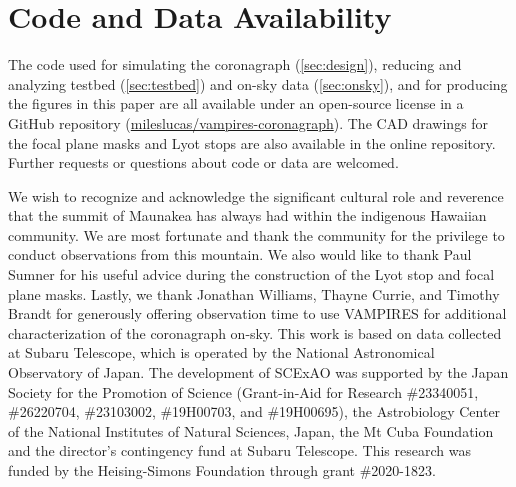 \documentclass[]{spie}  %
\begin{document}

\appendix    %


\section{Code and Data Availability}\label{sec:code}

The code used for simulating the coronagraph (\autoref{sec:design}), reducing and analyzing testbed (\autoref{sec:testbed}) and on-sky data (\autoref{sec:onsky}), and for producing the figures in this paper are all available under an open-source license in a GitHub repository (\href{https://github.com/mileslucas/vampires-coronagraph}{mileslucas/vampires-coronagraph}). The CAD drawings for the focal plane masks and Lyot stops are also available in the online repository. Further requests or questions about code or data are welcomed.

\acknowledgments

We wish to recognize and acknowledge the significant cultural role and reverence that the summit of Maunakea has always had within the indigenous Hawaiian community. We are most fortunate and thank the community for the privilege to conduct observations from this mountain. We also would like to thank Paul Sumner for his useful advice during the construction of the Lyot stop and focal plane masks. Lastly, we thank Jonathan Williams, Thayne Currie, and Timothy Brandt for generously offering observation time to use VAMPIRES for additional characterization of the coronagraph on-sky. This work is based on data collected at Subaru Telescope, which is operated by the National Astronomical Observatory of Japan. The development of SCExAO was supported by the Japan Society for the Promotion of Science (Grant-in-Aid for Research \#23340051, \#26220704, \#23103002, \#19H00703, and \#19H00695), the Astrobiology Center of the National Institutes of Natural Sciences, Japan, the Mt Cuba Foundation and the director's contingency fund at Subaru Telescope. This research was funded by the Heising-Simons Foundation through grant \#2020-1823.


\end{document}
